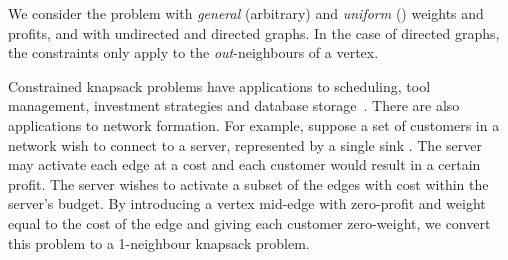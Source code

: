 \documentclass[12pt]{article}
\begin{document}
We consider the problem with {\em general}
(arbitrary) and {\em uniform} () weights
and profits, and with undirected and directed graphs.  In the case of
directed graphs, the constraints only apply to the {\em out}-neighbours of a vertex.

Constrained knapsack problems have applications to scheduling, tool
management, investment strategies and database
storage~\cite{KPP,BFFS05,Johnson:1983p1256}.  There are also
applications to network formation.  For example, suppose a set of
customers  in a network  wish to connect to a
server, represented by a single sink .  The server may
activate each edge at a cost and each customer would result in a
certain profit.  The server wishes to activate a subset of the edges
with cost within the server's budget. By introducing a vertex mid-edge
with zero-profit and weight equal to the cost of the edge and giving
each customer zero-weight, we convert this problem to a 1-neighbour
knapsack problem.
\end{document}
